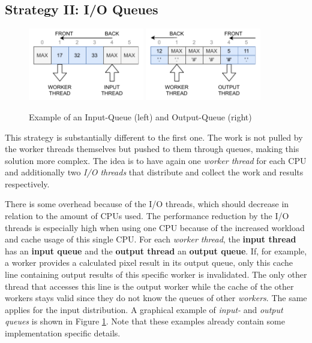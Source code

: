 \subsection{Strategy II: I/O Queues}
\label{ssec:strategy-ii}

\begin{figure}[b]
   \centering
   \includegraphics[width=0.45\textwidth]{mandelbrot/assets/input-queue.pdf}
   \includegraphics[width=0.45\textwidth]{mandelbrot/assets/output-queue.pdf}
 \caption{Example of an Input-Queue (left) and Output-Queue (right)}
 \label{fig:queues}
\end{figure}

This strategy is substantially different to the first one. The work is not pulled by the worker threads themselves but pushed to them through queues, making this solution more complex. The idea is to have again one \textit{worker thread} for each CPU and additionally two \textit{I/O threads} that distribute and collect the work and results respectively.

There is some overhead because of the I/O threads, which should decrease in relation to the amount of CPUs used. The performance reduction by the I/O threads is especially high when using one CPU because of the increased workload and cache usage of this single CPU. For each \textit{worker thread}, the \textbf{input thread} has an \textbf{input queue} and the \textbf{output thread} an \textbf{output queue}. If, for example, a worker provides a calculated pixel result in its output queue, only this cache line containing output results of this specific worker is invalidated. The only other thread that accesses this line is the output worker while the cache of the other workers stays valid since they do not know the queues of other \textit{workers}. The same applies for the input distribution. A graphical example of \textit{input-} and \textit{output queues} is shown in Figure \ref{fig:queues}. Note that these examples already contain some implementation specific details.

